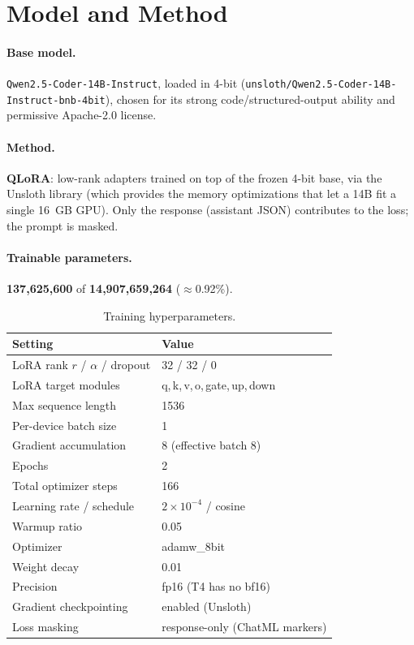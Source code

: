 \documentclass[11pt]{article}
\newcommand{\code}[1]{\texttt{#1}}
\begin{document}
\section{Model and Method}
\paragraph{Base model.} \code{Qwen2.5-Coder-14B-Instruct}, loaded in 4-bit
(\code{unsloth/Qwen2.5-Coder-14B-Instruct-bnb-4bit}), chosen for its strong code/structured-output
ability and permissive Apache-2.0 license.

\paragraph{Method.} \textbf{QLoRA}: low-rank adapters trained on top of the frozen 4-bit base,
via the Unsloth library (which provides the memory optimizations that let a 14B fit a single
16~GB GPU). Only the response (assistant JSON) contributes to the loss; the prompt is masked.

\paragraph{Trainable parameters.} \textbf{137{,}625{,}600} of \textbf{14{,}907{,}659{,}264}
($\approx$0.92\%).

\begin{table}[h]
\centering
\caption{Training hyperparameters.}
\begin{tabular}{ll}
\toprule
\textbf{Setting} & \textbf{Value} \\
\midrule
LoRA rank $r$ / $\alpha$ / dropout & 32 / 32 / 0 \\
LoRA target modules & q,\,k,\,v,\,o,\,gate,\,up,\,down \\
Max sequence length & 1536 \\
Per-device batch size & 1 \\
Gradient accumulation & 8 (effective batch 8) \\
Epochs & 2 \\
Total optimizer steps & 166 \\
Learning rate / schedule & $2\times10^{-4}$ / cosine \\
Warmup ratio & 0.05 \\
Optimizer & adamw\_8bit \\
Weight decay & 0.01 \\
Precision & fp16 (T4 has no bf16) \\
Gradient checkpointing & enabled (Unsloth) \\
Loss masking & response-only (ChatML markers) \\
\bottomrule
\end{tabular}
\end{table}
\end{document}
